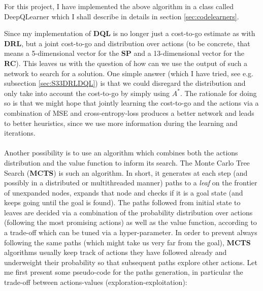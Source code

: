 For this project, I have implemented the above algorithm in a class called DeepQLearner which I shall describe in details in section \ref{sec:codelearners}.


\label{sec:TheoryMCTS}

Since my implementation of \textbf{DQL} is no longer just a cost-to-go estimate as with \textbf{DRL}, but a joint cost-to-go and distribution over actions (to be concrete, that means a 5-dimensional vector for the \textbf{SP} and a 13-dimensional vector for the \textbf{RC}). This leaves us with the question of how can we use the output of such a network to search for a solution. One simple answer (which I have tried, see e.g. subsection \ref{sec:S33DRLDQL}) is that we could disregard the distribution and only take into account the cost-to-go by simply using $A^{*}$. The rationale for doing so is that we might hope that jointly learning the cost-to-go and the actions via a combination of MSE and cross-entropy-loss produces a better network and leads to better heuristics, since we use more information during the learning and iterations.
\\
\\
Another possibility is to use an algorithm which combines both the actions distribution and the value function to inform its search. The Monte Carlo Tree Search (\textbf{MCTS}) is such an algorithm. In short, it generates at each step (and possibly in a distributed or multithreaded manner) paths to a \textit{leaf} on the frontier of unexpanded nodes, expands that node and checks if it is a goal state (and keeps going until the goal is found). The paths followed from initial state to leaves are decided via a combination of the probability distribution over actions (following the most promising actions) as well as the value function, according to a trade-off which can be tuned via a hyper-parameter. In order to prevent always following the same paths (which might take us very far from the goal), \textbf{MCTS} algorithms usually keep track of actions they have followed already and underweight their probability so that subsequent paths explore other actions. Let me first present some pseudo-code for the paths generation, in particular the trade-off between actions-values (exploration-exploitation):
\\


